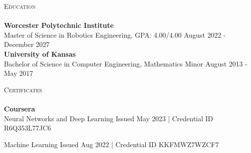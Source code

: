 \documentclass[a4paper]{article}
\newcommand{\lineunder} {
    \vspace*{-8pt} \\
    \hspace*{-18pt} \hrulefill \\
}
\newcommand{\header} [1] {
    {\hspace*{-18pt}\vspace*{6pt} \textsc{#1}}
    \vspace*{-6pt} \lineunder
}
\begin{document}
\header{Education}
\textbf{Worcester Polytechnic Institute}\\
Master of Science in Robotics Engineering, GPA: 4.00/4.00 \hfill August 2022 - December 2027\\
\vspace{2mm}
\textbf{University of Kansas}\\
Bachelor of Science in Computer Engineering, Mathematics Minor \hfill August 2013 - May 2017\\
\vspace{2mm}

\header{Certificates}
{\textbf{Coursera}}\\
\vspace{2mm}
Neural Networks and Deep Learning \hfill Issued May 2023 | \footnotesize{Credential ID R6Q353L77JC6}

\normalsize{}

\vspace{2mm}
Machine Learning \hfill Issued Aug 2022 | \footnotesize{Credential ID KKFMWZ7WZCF7}
\end{document}
